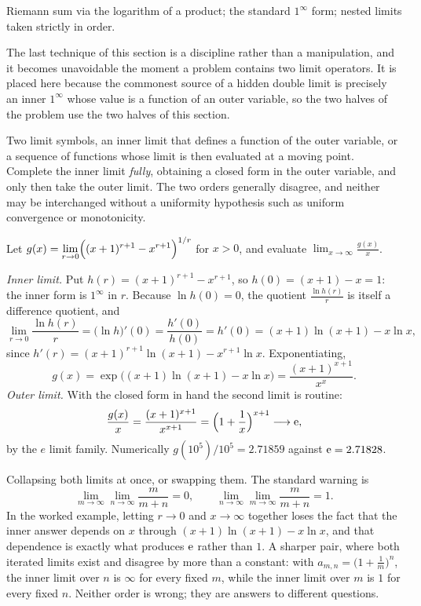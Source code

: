 \begin{seealsob}Riemann sum via the logarithm of a product; the standard $1^{\infty}$ form; nested limits taken strictly in order.\end{seealsob}

The last technique of this section is a discipline rather than a manipulation, and it becomes unavoidable the moment a problem contains two limit operators. It is placed here because the commonest source of a hidden double limit is precisely an inner $1^{\infty}$ whose value is a function of an outer variable, so the two halves of the problem use the two halves of this section.

\cue Two limit symbols, an inner limit that defines a function of the outer variable, or a sequence of functions whose limit is then evaluated at a moving point.
\method Complete the inner limit \emph{fully}, obtaining a closed form in the outer variable, and only then take the outer limit. The two orders generally disagree, and neither may be interchanged without a uniformity hypothesis such as uniform convergence or monotonicity.

\begin{worked}
Let $g(x)=\displaystyle\lim_{r\to0}\Bigl((x+1)^{r+1}-x^{r+1}\Bigr)^{1/r}$ for $x>0$, and evaluate $\displaystyle\lim_{x\to\infty}\frac{g(x)}{x}$.

\emph{Inner limit.} Put $h(r)=(x+1)^{r+1}-x^{r+1}$, so $h(0)=(x+1)-x=1$: the inner form is $1^{\infty}$ in $r$. Because $\ln h(0)=0$, the quotient $\tfrac{\ln h(r)}{r}$ is itself a difference quotient, and
\[\lim_{r\to0}\frac{\ln h(r)}{r}=\bigl(\ln h\bigr)'(0)=\frac{h'(0)}{h(0)}=h'(0)=(x+1)\ln(x+1)-x\ln x,\]
since $h'(r)=(x+1)^{r+1}\ln(x+1)-x^{r+1}\ln x$. Exponentiating,
\[g(x)=\exp\bigl((x+1)\ln(x+1)-x\ln x\bigr)=\frac{(x+1)^{x+1}}{x^{x}} .\]
\emph{Outer limit.} With the closed form in hand the second limit is routine:
\[\frac{g(x)}{x}=\frac{(x+1)^{x+1}}{x^{x+1}}=\Bigl(1+\frac1x\Bigr)^{x+1}\longrightarrow \mathrm{e} ,\]
by the $e$ limit family. Numerically $g(10^{5})/10^{5}=2.71859$ against $\mathrm{e}=2.71828$.
\end{worked}

\begin{trap}
Collapsing both limits at once, or swapping them. The standard warning is
\[\lim_{m\to\infty}\lim_{n\to\infty}\frac{m}{m+n}=0,\qquad \lim_{n\to\infty}\lim_{m\to\infty}\frac{m}{m+n}=1 .\]
In the worked example, letting $r\to0$ and $x\to\infty$ together loses the fact that the inner answer depends on $x$ through $(x+1)\ln(x+1)-x\ln x$, and that dependence is exactly what produces $\mathrm{e}$ rather than $1$. A sharper pair, where both iterated limits exist and disagree by more than a constant: with $a_{m,n}=\bigl(1+\tfrac1m\bigr)^{n}$, the inner limit over $n$ is $\infty$ for every fixed $m$, while the inner limit over $m$ is $1$ for every fixed $n$. Neither order is wrong; they are answers to different questions.
\end{trap}

